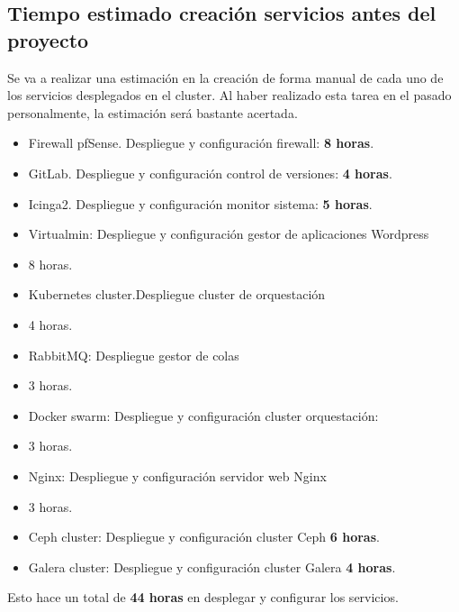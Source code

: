 \subsection{Tiempo estimado creación servicios antes del proyecto}
	\begin{text}
		Se va a realizar una estimación en la creación de forma manual de cada uno de los servicios desplegados en el cluster. Al haber realizado esta tarea en el pasado personalmente, la estimación será bastante acertada.
		\clearpage
		\begin{itemize}
			\item Firewall pfSense. Despliegue y configuración firewall: \textbf{8 horas}.
			\item GitLab. Despliegue y configuración control de versiones: \textbf{4 horas}.
			\item Icinga2. Despliegue y configuración monitor sistema: \textbf{5 horas}.
			\item Virtualmin: Despliegue y configuración gestor de aplicaciones Wordpress \item{8 horas}.
			\item Kubernetes cluster.Despliegue cluster de orquestación \item{4 horas}.
			\item RabbitMQ: Despliegue gestor de colas \item{3 horas}.
			\item Docker swarm: Despliegue y configuración cluster orquestación: \item{3 horas}.
			\item Nginx: Despliegue y configuración servidor web Nginx \item{3 horas}.
			\item Ceph cluster: Despliegue y configuración cluster Ceph \textbf{6 horas}.
			\item Galera cluster: Despliegue y configuración cluster Galera \textbf{4 horas}.
		\end{itemize}
	Esto hace un total de \textbf{44 horas} en desplegar y configurar los servicios.
	\end{text}

